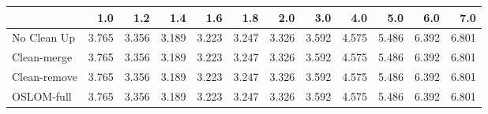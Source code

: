 \begin{tabular}{lrrrrrrrrrrr}
\toprule
{} &   1.0 &   1.2 &   1.4 &   1.6 &   1.8 &   2.0 &   3.0 &   4.0 &   5.0 &   6.0 &   7.0 \\
\midrule
No Clean Up  & 3.765 & 3.356 & 3.189 & 3.223 & 3.247 & 3.326 & 3.592 & 4.575 & 5.486 & 6.392 & 6.801 \\
Clean-merge  & 3.765 & 3.356 & 3.189 & 3.223 & 3.247 & 3.326 & 3.592 & 4.575 & 5.486 & 6.392 & 6.801 \\
Clean-remove & 3.765 & 3.356 & 3.189 & 3.223 & 3.247 & 3.326 & 3.592 & 4.575 & 5.486 & 6.392 & 6.801 \\
OSLOM-full   & 3.765 & 3.356 & 3.189 & 3.223 & 3.247 & 3.326 & 3.592 & 4.575 & 5.486 & 6.392 & 6.801 \\
\bottomrule
\end{tabular}
